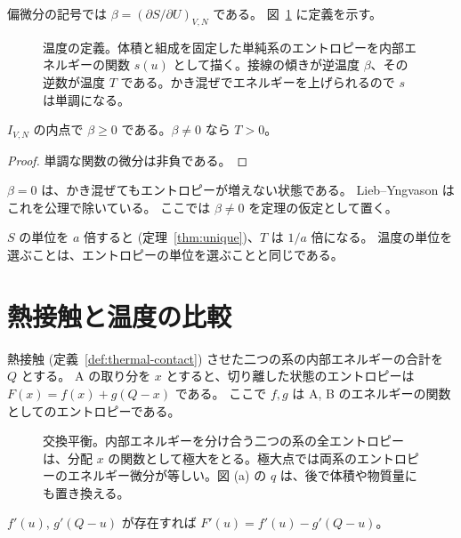 偏微分の記号では $\beta = (\partial S / \partial U)_{V, N}$ である。
図~\ref{fig:temperature} に定義を示す。

\begin{figure}[htbp]
  \centering
  \caption{温度の定義。体積と組成を固定した単純系のエントロピーを内部エネルギーの関数 $s(u)$ として描く。接線の傾きが逆温度 $\beta$、その逆数が温度 $T$ である。かき混ぜでエネルギーを上げられるので $s$ は単調になる。}
  \label{fig:temperature}
\end{figure}

\begin{theorem}[温度は正]
  \label{thm:temperature-pos}
  \leanok
  $I_{V,N}$ の内点で $\beta \ge 0$ である。$\beta \ne 0$ なら $T > 0$。
\end{theorem}

\begin{proof}
  \leanok
  単調な関数の微分は非負である。
\end{proof}

$\beta = 0$ は、かき混ぜてもエントロピーが増えない状態である。
Lieb--Yngvason はこれを公理で除いている。
ここでは $\beta \ne 0$ を定理の仮定として置く。

$S$ の単位を $a$ 倍すると (定理~\ref{thm:unique})、$T$ は $1/a$ 倍になる。
温度の単位を選ぶことは、エントロピーの単位を選ぶことと同じである。

\section{熱接触と温度の比較}

熱接触 (定義~\ref{def:thermal-contact}) させた二つの系の内部エネルギーの合計を $Q$ とする。
A の取り分を $x$ とすると、切り離した状態のエントロピーは $F(x) = f(x) + g(Q - x)$ である。
ここで $f, g$ は A, B のエネルギーの関数としてのエントロピーである。

\begin{figure}[htbp]
  \centering
  \caption{交換平衡。内部エネルギーを分け合う二つの系の全エントロピーは、分配 $x$ の関数として極大をとる。極大点では両系のエントロピーのエネルギー微分が等しい。図 (a) の $q$ は、後で体積や物質量にも置き換える。}
  \label{fig:exchange}
\end{figure}

\begin{lemma}[全エントロピーの微分]
  \label{lem:exchange-deriv}
  \leanok
  $f'(u)$, $g'(Q-u)$ が存在すれば $F'(u) = f'(u) - g'(Q - u)$。
\end{lemma}

